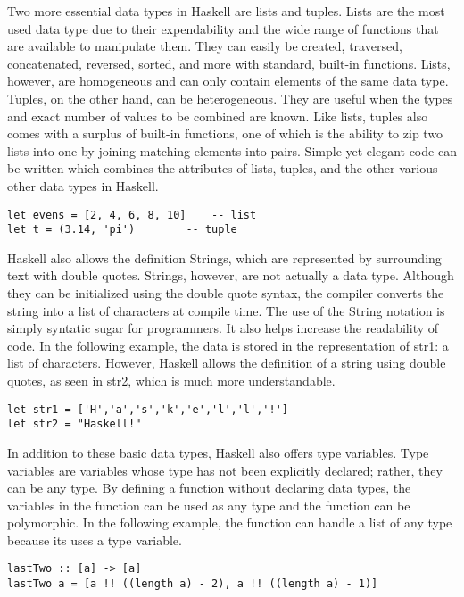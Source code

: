 \documentclass[titlepage,12pt]{article}
\begin{document}
Two more essential data types in Haskell are lists and tuples. Lists are the most used data type due to their expendability and the wide range of functions that are available to manipulate them. They can easily be created, traversed, concatenated, reversed, sorted, and more with standard, built-in functions. Lists, however, are homogeneous and can only contain elements of the same data type. Tuples, on the other hand, can be heterogeneous. They are useful when the types and exact number of values to be combined are known. Like lists, tuples also comes with a surplus of built-in functions, one of which is the ability to zip two lists into one by joining matching elements into pairs. Simple yet elegant code can be written which combines the attributes of lists, tuples, and the other various other data types in Haskell.

\begin{verbatim}
let evens = [2, 4, 6, 8, 10]	-- list
let t = (3.14, 'pi')		-- tuple
\end{verbatim}

Haskell also allows the definition Strings, which are represented by surrounding text with double quotes. Strings, however, are not actually a data type. Although they can be initialized using the double quote syntax, the compiler converts the string into a list of characters at compile time. The use of the String notation is simply syntatic sugar for programmers. It also helps increase the readability of code. In the following example, the data is stored in the representation of str1: a list of characters. However, Haskell allows the definition of a string using double quotes, as seen in str2, which is much more understandable.

\begin{verbatim}
let str1 = ['H','a','s','k','e','l','l','!']
let str2 = "Haskell!"
\end{verbatim}

In addition to these basic data types, Haskell also offers type variables. Type variables are variables whose type has not been explicitly declared; rather, they can be any type. By defining a function without declaring data types, the variables in the function can be used as any type and the function can be polymorphic. In the following example, the function can handle a list of any type because its uses a type variable. 

\begin{verbatim}
lastTwo :: [a] -> [a]
lastTwo a = [a !! ((length a) - 2), a !! ((length a) - 1)]
\end{verbatim}
\end{document}
